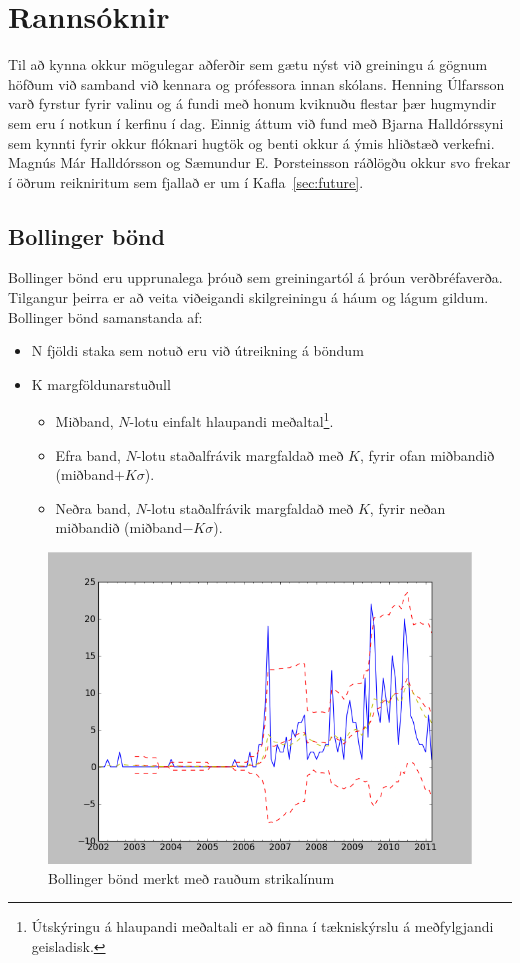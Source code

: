 \documentclass{article}
\begin{document}
\newpage


\section{Rannsóknir}
\label{sec:research}
Til að kynna okkur mögulegar aðferðir sem gætu nýst við greiningu á gögnum
höfðum við samband við kennara og prófessora innan skólans. Henning Úlfarsson
varð fyrstur fyrir valinu og á fundi með honum kviknuðu flestar þær hugmyndir sem eru
í notkun í kerfinu í dag. Einnig áttum við fund með Bjarna Halldórssyni sem
kynnti fyrir okkur flóknari hugtök og benti okkur á ýmis hliðstæð verkefni.
Magnús Már Halldórsson og Sæmundur E. Þorsteinsson ráðlögðu okkur svo frekar í
öðrum reikniritum sem fjallað er um í Kafla~\ref{sec:future}.



\subsection{Bollinger bönd}
\label{sec:research_bollinger_bands}

Bollinger bönd eru upprunalega þróuð sem greiningartól
á þróun verðbréfaverða. 
Tilgangur þeirra er að veita viðeigandi skilgreiningu á háum og lágum gildum.
 \\

Bollinger bönd samanstanda af:

\begin{itemize}
  \item N fjöldi staka sem notuð eru við útreikning á böndum
  \item K margföldunarstuðull
  \begin{itemize}
    \item Miðband, $N$-lotu einfalt hlaupandi meðaltal\footnote[1]{Útskýringu á
  hlaupandi meðaltali er að finna í tækniskýrslu á meðfylgjandi geisladisk.}.
    \item Efra band, $N$-lotu staðalfrávik margfaldað með $K$, fyrir ofan
  miðbandið (miðband$+ K\sigma$).
    \item Neðra band, $N$-lotu staðalfrávik margfaldað með $K$, fyrir neðan
  miðbandið (miðband$- K\sigma$).
  \end{itemize}
\end{itemize}


\begin{figure}[H]
  \centering
  \includegraphics[width=.58\textwidth]{Bollinger.png} 
  \caption{Bollinger bönd merkt með rauðum strikalínum} 
\end{figure}
\end{document}
